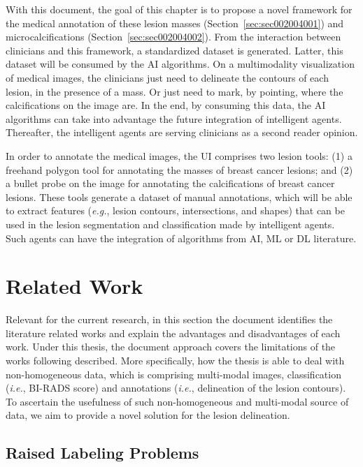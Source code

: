 With this document, the goal of this chapter is to propose a novel framework for the medical annotation of these lesion masses (Section~\ref{sec:sec002004001}) and microcalcifications (Section~\ref{sec:sec002004002}).
From the interaction between clinicians and this framework, a standardized dataset is generated.
Latter, this dataset will be consumed by the \ac{AI} algorithms.
On a multimodality visualization of medical images, the clinicians just need to delineate the contours of each lesion, in the presence of a mass.
Or just need to mark, by pointing, where the calcifications on the image are.
In the end, by consuming this data, the \ac{AI} algorithms can take into advantage the future integration of intelligent agents.
Thereafter, the intelligent agents are serving clinicians as a second reader opinion.

In order to annotate the medical images, the \ac{UI} comprises two lesion tools:
(1) a freehand polygon tool for annotating the masses of breast cancer lesions; and
(2) a bullet probe on the image for annotating the calcifications of breast cancer lesions.
These tools generate a dataset of manual annotations, which will be able to extract features ({\it e.g.}, lesion contours, intersections, and shapes) that can be used in the lesion segmentation and classification made by intelligent agents.
Such agents can have the integration of algorithms from \ac{AI}, \ac{ML} or \ac{DL} literature.

\section{Related Work}
\label{sec:sec004002}

Relevant for the current research, in this section the document identifies the literature related works and explain the advantages and disadvantages of each work.
Under this thesis, the document approach covers the limitations of the works following described.
More specifically, how the thesis is able to deal with non-homogeneous data, which is comprising multi-modal images, classification ({\it i.e.}, \ac{BI-RADS} score) and annotations ({\it i.e.}, delineation of the lesion contours).
To ascertain the usefulness of such non-homogeneous and multi-modal source of data, we aim to provide a novel solution for the lesion delineation.

\subsection{Raised Labeling Problems}
\label{sec:sec004002001}

